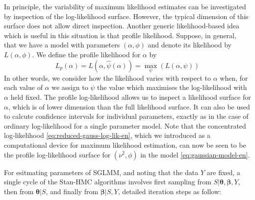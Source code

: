 \documentclass[12pt,a4paper,UTF8,twoside]{book}
\begin{document}
In principle, the variability of maximum likelihood estimates can be
investigated by inspection of the log-likelihood surface. However, the
typical dimension of this surface does not allow direct inspection.
Another generic likelihood-based idea which is useful in this situation
is that profile likelihood. Suppose, in general, that we have a model
with parameters \((\alpha,\phi)\) and denote its likelihood by
\(L(\alpha,\phi)\). We define the profile likelihood for \(\alpha\) by
\begin{equation}
L_{p}(\alpha) = L(\alpha,\hat{\psi}(\alpha)) = \max_{\psi} (L(\alpha,\psi))
\label{eq:profile-log-lik-en}
\end{equation} \noindent In other words, we consider how the likelihood
varies with respect to \(\alpha\) when, for each value of \(\alpha\) we
assign to \(\psi\) the value which maximises the log-likelihood with
\(\alpha\) held fixed. The profile log-likelihood allows us to inspect a
likelihood surface for \(\alpha\), which is of lower dimension than the
full likelihood surface. It can also be used to calcute confidence
intervals for individual parameters, exactly as in the case of ordinary
log-likelihood for a single parameter model. Note that the concentrated
log-likelihood \eqref{eq:reduced-gauss-log-lik-en}, which we introduced as
a computational device for maximum likelihood estimation, can now be
seen to be the profile log-likelihood surface for \((\nu^2,\phi)\) in
the model \eqref{eq:gaussian-model-en}.

For esitmating parameters of SGLMM, and noting that the data \(Y\) are
fixed, a single cycle of the Stan-HMC algorithms involves first sampling
from \(S|\boldsymbol{\theta},\boldsymbol{\beta},Y\), then from
\(\boldsymbol{\theta}|S\), and finally from \(\boldsymbol{\beta}|S,Y\),
detailed iteration steps as follow:
\end{document}

